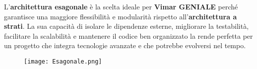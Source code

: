 L’\textbf{architettura esagonale} è la scelta ideale per \textbf{ Vimar GENIALE} perché garantisce una maggiore flessibilità e modularità rispetto all’\textbf{architettura a strati}. La sua capacità di isolare le dipendenze esterne, migliorare la testabilità, facilitare la scalabilità e mantenere il codice ben organizzato la rende perfetta per un progetto che integra tecnologie avanzate e che potrebbe evolversi nel tempo.
\begin{figure}[h]
    \centering
    \texttt{[image: Esagonale.png]}
\end{figure}